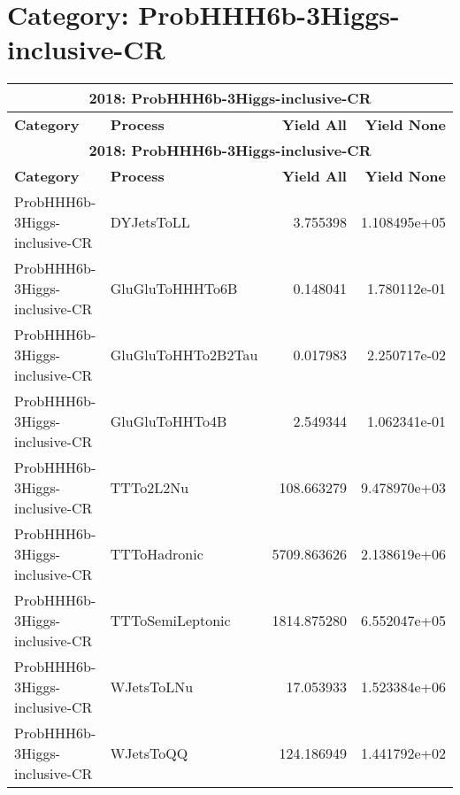 \documentclass{article}
\begin{document}
\section*{Category: ProbHHH6b-3Higgs-inclusive-CR}
\begin{longtable}[c]{|l|l|r|r|}
\hline
\multicolumn{4}{|c|}{\textbf{2018: ProbHHH6b-3Higgs-inclusive-CR}} \\
\hline
\textbf{Category} & \textbf{Process} & \textbf{Yield All} & \textbf{Yield None} \\
\hline
\endfirsthead
\hline
\multicolumn{4}{|c|}{\textbf{2018: ProbHHH6b-3Higgs-inclusive-CR}} \\
\hline
\textbf{Category} & \textbf{Process} & \textbf{Yield All} & \textbf{Yield None} \\
\hline
\endhead
ProbHHH6b-3Higgs-inclusive-CR & DYJetsToLL & 3.755398 & 1.108495e+05 \\
\hline
ProbHHH6b-3Higgs-inclusive-CR & GluGluToHHHTo6B & 0.148041 & 1.780112e-01 \\
\hline
ProbHHH6b-3Higgs-inclusive-CR & GluGluToHHTo2B2Tau & 0.017983 & 2.250717e-02 \\
\hline
ProbHHH6b-3Higgs-inclusive-CR & GluGluToHHTo4B & 2.549344 & 1.062341e-01 \\
\hline
ProbHHH6b-3Higgs-inclusive-CR & TTTo2L2Nu & 108.663279 & 9.478970e+03 \\
\hline
ProbHHH6b-3Higgs-inclusive-CR & TTToHadronic & 5709.863626 & 2.138619e+06 \\
\hline
ProbHHH6b-3Higgs-inclusive-CR & TTToSemiLeptonic & 1814.875280 & 6.552047e+05 \\
\hline
ProbHHH6b-3Higgs-inclusive-CR & WJetsToLNu & 17.053933 & 1.523384e+06 \\
\hline
ProbHHH6b-3Higgs-inclusive-CR & WJetsToQQ & 124.186949 & 1.441792e+02 \\
\hline
\end{longtable}
\end{document}
